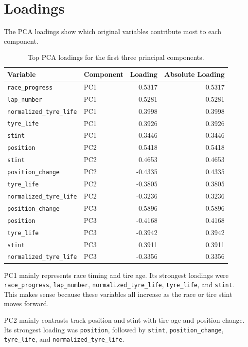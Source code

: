 \documentclass[11pt,oneside,openany]{book}
\begin{document}
\section{Loadings}

The PCA loadings show which original variables contribute most to each component.

\begin{table}[H]
\centering
\small
\caption{Top PCA loadings for the first three principal components.}
\begin{tabular}{llrr}
\toprule
Variable & Component & Loading & Absolute Loading\\
\midrule
\texttt{race\_progress} & PC1 & 0.5317 & 0.5317\\
\texttt{lap\_number} & PC1 & 0.5281 & 0.5281\\
\texttt{normalized\_tyre\_life} & PC1 & 0.3998 & 0.3998\\
\texttt{tyre\_life} & PC1 & 0.3926 & 0.3926\\
\texttt{stint} & PC1 & 0.3446 & 0.3446\\
\midrule
\texttt{position} & PC2 & 0.5418 & 0.5418\\
\texttt{stint} & PC2 & 0.4653 & 0.4653\\
\texttt{position\_change} & PC2 & -0.4335 & 0.4335\\
\texttt{tyre\_life} & PC2 & -0.3805 & 0.3805\\
\texttt{normalized\_tyre\_life} & PC2 & -0.3236 & 0.3236\\
\midrule
\texttt{position\_change} & PC3 & 0.5896 & 0.5896\\
\texttt{position} & PC3 & -0.4168 & 0.4168\\
\texttt{tyre\_life} & PC3 & -0.3942 & 0.3942\\
\texttt{stint} & PC3 & 0.3911 & 0.3911\\
\texttt{normalized\_tyre\_life} & PC3 & -0.3356 & 0.3356\\
\bottomrule
\end{tabular}
\end{table}

PC1 mainly represents race timing and tire age. Its strongest loadings were \texttt{race\_progress}, \texttt{lap\_number}, \texttt{normalized\_tyre\_life}, \texttt{tyre\_life}, and \texttt{stint}. This makes sense because these variables all increase as the race or tire stint moves forward.

PC2 mainly contrasts track position and stint with tire age and position change. Its strongest loading was \texttt{position}, followed by \texttt{stint}, \texttt{position\_change}, \texttt{tyre\_life}, and \texttt{normalized\_tyre\_life}.
\end{document}
